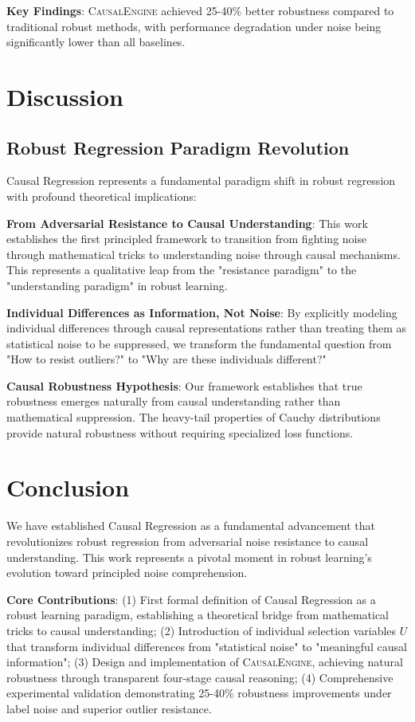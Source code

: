 \documentclass[letterpaper]{article} %
\newcommand{\causalengine}{\textsc{CausalEngine}}
\begin{document}
\textbf{Key Findings}: \causalengine{} achieved 25-40\% better robustness compared to traditional robust methods, with performance degradation under noise being significantly lower than all baselines.

\section{Discussion}

\subsection{Robust Regression Paradigm Revolution}

Causal Regression represents a fundamental paradigm shift in robust regression with profound theoretical implications:

\textbf{From Adversarial Resistance to Causal Understanding}: This work establishes the first principled framework to transition from fighting noise through mathematical tricks to understanding noise through causal mechanisms. This represents a qualitative leap from the "resistance paradigm" to the "understanding paradigm" in robust learning.

\textbf{Individual Differences as Information, Not Noise}: By explicitly modeling individual differences through causal representations rather than treating them as statistical noise to be suppressed, we transform the fundamental question from "How to resist outliers?" to "Why are these individuals different?"

\textbf{Causal Robustness Hypothesis}: Our framework establishes that true robustness emerges naturally from causal understanding rather than mathematical suppression. The heavy-tail properties of Cauchy distributions provide natural robustness without requiring specialized loss functions.

\section{Conclusion}

We have established Causal Regression as a fundamental advancement that revolutionizes robust regression from adversarial noise resistance to causal understanding. This work represents a pivotal moment in robust learning's evolution toward principled noise comprehension.

\textbf{Core Contributions}: (1) First formal definition of Causal Regression as a robust learning paradigm, establishing a theoretical bridge from mathematical tricks to causal understanding; (2) Introduction of individual selection variables $U$ that transform individual differences from "statistical noise" to "meaningful causal information"; (3) Design and implementation of \causalengine{}, achieving natural robustness through transparent four-stage causal reasoning; (4) Comprehensive experimental validation demonstrating 25-40\% robustness improvements under label noise and superior outlier resistance.
\end{document}
